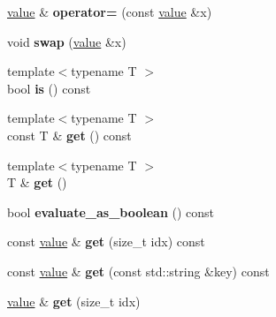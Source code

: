 \begin{DoxyCompactItemize}
\item 
\hypertarget{classpicojson_1_1value_acc5e4506e6a793af5132983573f9da6a}{\hyperlink{classpicojson_1_1value}{value} \& {\bfseries operator=} (const \hyperlink{classpicojson_1_1value}{value} \&x)}\label{classpicojson_1_1value_acc5e4506e6a793af5132983573f9da6a}

\item 
\hypertarget{classpicojson_1_1value_a6e3ac589ed811603ef9dadc6f91c737d}{void {\bfseries swap} (\hyperlink{classpicojson_1_1value}{value} \&x)}\label{classpicojson_1_1value_a6e3ac589ed811603ef9dadc6f91c737d}

\item 
\hypertarget{classpicojson_1_1value_ab67330d0c135a7c0fe689ef2294bda40}{{\footnotesize template$<$typename T $>$ }\\bool {\bfseries is} () const }\label{classpicojson_1_1value_ab67330d0c135a7c0fe689ef2294bda40}

\item 
\hypertarget{classpicojson_1_1value_a1b6f107770f2ae6fa9b4939313b0a917}{{\footnotesize template$<$typename T $>$ }\\const T \& {\bfseries get} () const }\label{classpicojson_1_1value_a1b6f107770f2ae6fa9b4939313b0a917}

\item 
\hypertarget{classpicojson_1_1value_a94f71153b3d14df524397a5cafcef2fc}{{\footnotesize template$<$typename T $>$ }\\T \& {\bfseries get} ()}\label{classpicojson_1_1value_a94f71153b3d14df524397a5cafcef2fc}

\item 
\hypertarget{classpicojson_1_1value_afa68a0efe890e7ab4a26cd7e3f842eb5}{bool {\bfseries evaluate\+\_\+as\+\_\+boolean} () const }\label{classpicojson_1_1value_afa68a0efe890e7ab4a26cd7e3f842eb5}

\item 
\hypertarget{classpicojson_1_1value_a93d61431aeb912ba605e20c2cd2a0d97}{const \hyperlink{classpicojson_1_1value}{value} \& {\bfseries get} (size\+\_\+t idx) const }\label{classpicojson_1_1value_a93d61431aeb912ba605e20c2cd2a0d97}

\item 
\hypertarget{classpicojson_1_1value_a703fb6a50c2e8eec30fdf6b03eec1493}{const \hyperlink{classpicojson_1_1value}{value} \& {\bfseries get} (const std\+::string \&key) const }\label{classpicojson_1_1value_a703fb6a50c2e8eec30fdf6b03eec1493}

\item 
\hypertarget{classpicojson_1_1value_adf5edc5f70df6a5ebe78bb32c2ba3e91}{\hyperlink{classpicojson_1_1value}{value} \& {\bfseries get} (size\+\_\+t idx)}\label{classpicojson_1_1value_adf5edc5f70df6a5ebe78bb32c2ba3e91}


\end{DoxyCompactItemize}
